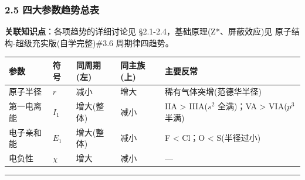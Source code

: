 \subsubsection{2.5 四大参数趋势总表}\label{ux56dbux5927ux53c2ux6570ux8d8bux52bfux603bux8868}

\textbf{关联知识点}：各项趋势的详细讨论见 §2.1-2.4，基础原理(Z*、屏蔽效应)见 原子结构-超级充实版(自学完整)\#3.6 周期律四趋势。

{\def\LTcaptype{none} %
\begin{longtable}[]{@{}
  >{\raggedright\arraybackslash}p{}
  >{\centering\arraybackslash}p{}
  >{\centering\arraybackslash}p{}
  >{\centering\arraybackslash}p{}
  >{\raggedright\arraybackslash}p{}@{}}
\toprule\noalign{}
\begin{minipage}[b]{\linewidth}\raggedright
参数
\end{minipage} & \begin{minipage}[b]{\linewidth}\centering
符号
\end{minipage} & \begin{minipage}[b]{\linewidth}\centering
同周期(左)
\end{minipage} & \begin{minipage}[b]{\linewidth}\centering
同主族(上)
\end{minipage} & \begin{minipage}[b]{\linewidth}\raggedright
主要反常
\end{minipage} \\
\midrule\noalign{}
\endhead
\bottomrule\noalign{}
\endlastfoot
原子半径 & \(r\) &  减小 &  增大 & 稀有气体突增(范德华半径) \\
第一电离能 & \(I_1\) &  增大(整体) &  减小 & IIA \textgreater{} IIIA(\(s^2\) 全满)；VA \textgreater{} VIA(\(p^3\) 半满) \\
电子亲和能 & \(E_1\) &  增大(整体) &  减小 & F \textless{} Cl；O \textless{} S(半径过小) \\
电负性 & \(\chi\) &  增大 &  减小 & --- \\
\end{longtable}
}

\begin{center}\rule{0.5\linewidth}{0.5pt}\end{center}

